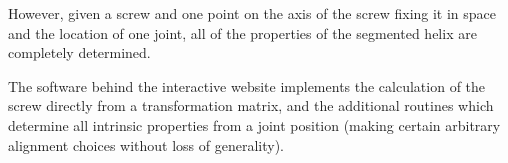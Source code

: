 \documentclass{svproc}
\begin{document}
However, given a screw and one point on the axis of the screw fixing it in space
and the location of one joint, all of the properties of the segmented helix are completely determined.

The software behind the interactive website implements the calculation of the screw
directly from a transformation matrix, and
the additional routines which determine all intrinsic properties from a joint position (making
certain arbitrary alignment choices without loss of generality).





\end{document}
